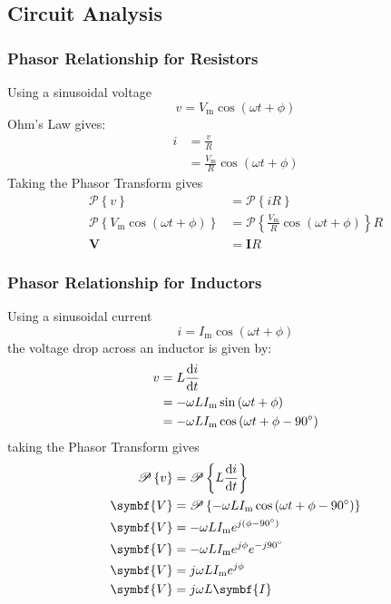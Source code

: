 \documentclass{article}
\begin{document}
\subsection{Circuit Analysis}
\subsubsection{Phasor Relationship for Resistors}
Using a sinusoidal voltage
\begin{equation*}
    v = V_{\mathrm{m}}\cos{\left( \omega t + \phi \right)}
\end{equation*}
Ohm's Law gives:
\begin{align*}
    i &= \frac{v}{R} \\
    &= \frac{V_{\mathrm{m}}}{R} \cos{\left( \omega t + \phi \right)}
\end{align*}
Taking the Phasor Transform gives
\begin{align*}
    \mathscr{P}\left\{ v \right\} &= \mathscr{P}\left\{ iR \right\} \\
    \mathscr{P}\left\{ V_{\mathrm{m}}\cos{\left( \omega t + \phi \right)} \right\} &= \mathscr{P}\left\{ \frac{V_{\mathrm{m}}}{R} \cos{\left( \omega t + \phi \right)} \right\} R \\
    \symbf{V} &= \symbf{I} R
\end{align*}
\subsubsection{Phasor Relationship for Inductors}
Using a sinusoidal current
\begin{equation*}
    i = I_{\mathrm{m}}\cos{\left( \omega t + \phi \right)}
\end{equation*}
the voltage drop across an inductor is given by:
\begin{align*}
    v &= L \dv{i}{t} \\
    &= -\omega L I_{\mathrm{m}} \sin{\left( \omega t + \phi \right)} \\
    &= -\omega L I_{\mathrm{m}} \cos{\left( \omega t + \phi - \SI{90}{\degree} \right)}
\end{align*} 
taking the Phasor Transform gives
\begin{align*}
    \mathscr{P}\left\{ v \right\} &= \mathscr{P}\left\{ L \dv{i}{t} \right\} \\
    \symbf{V} &= \mathscr{P}\left\{ -\omega L I_{\mathrm{m}} \cos{\left( \omega t + \phi - \SI{90}{\degree} \right)} \right\} \\
    \symbf{V} &= -\omega L I_{\mathrm{m}} \e^{j\left( \phi - \SI{90}{\degree} \right)} \\
    \symbf{V} &= -\omega L I_{\mathrm{m}} \e^{j \phi} \e^{-j\SI{90}{\degree}} \\
    \symbf{V} &= j\omega L I_{\mathrm{m}} \e^{j \phi} \\
    \symbf{V} &= j\omega L \symbf{I} 
\end{align*}
\end{document}
